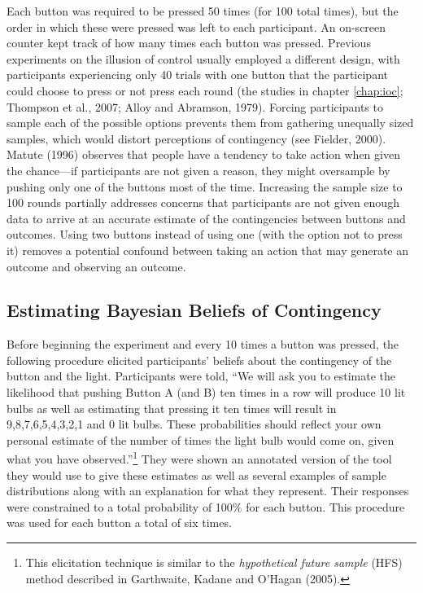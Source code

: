 \documentclass[USenglish,letterpaper,12pt,extrafontsizes,oneside,onecolumn,final]{memoir}
\begin{document}
Each button was required to be pressed 50 times (for 100 total times), but the order in which these were pressed was left to each participant.  An on-screen counter kept track of how many times each button was pressed.  Previous experiments on the illusion of control usually employed a different design, with participants experiencing only 40 trials with one button that the participant could choose to press or not press each round (the studies in chapter \ref{chap:ioc}; Thompson et al., 2007; Alloy and Abramson, 1979).  Forcing participants to sample each of the possible options prevents them from gathering unequally sized samples, which would distort perceptions of contingency (see Fielder, 2000).  Matute (1996) observes that people have a tendency to take action when given the chance---if participants are not given a reason, they might oversample by pushing only one of the buttons most of the time. Increasing the sample size to 100 rounds partially addresses concerns that participants are not given enough data to arrive at an accurate estimate of the contingencies between buttons and outcomes.  Using two buttons instead of using one (with the option not to press it) removes a potential confound between taking an action that may generate an outcome and observing an outcome. 

\subsection{Estimating Bayesian Beliefs of Contingency}

Before beginning the experiment and every 10 times a button was pressed, the following procedure elicited participants' beliefs about the contingency of the button and the light. Participants were told, ``We will ask you to estimate the likelihood that pushing Button A (and B) ten times in a row will produce 10 lit bulbs as well as estimating that pressing it ten times will result in 9,8,7,6,5,4,3,2,1 and 0 lit bulbs.  These probabilities should reflect your own personal estimate of the number of times the light bulb would come on, given what you have observed.''\footnote{This elicitation technique is similar to the \emph{hypothetical future sample} (HFS) method described in Garthwaite, Kadane and O'Hagan (2005).} They were shown an annotated version of the tool they would use to give these estimates as well as several examples of sample distributions along with an explanation for what they represent.  Their responses were constrained to a total probability of 100\% for each button.  This procedure was used for each button a total of six times. 
\end{document}
